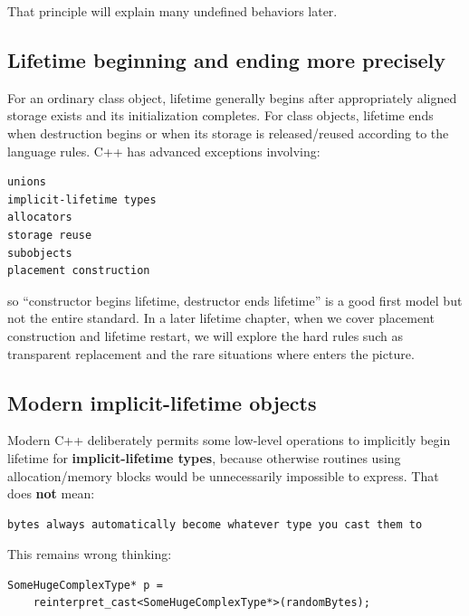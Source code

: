 That principle will explain many undefined behaviors later.

\subsection{Lifetime beginning and ending more precisely}\label{05-engine-i-ch002-lifetime-beginning-and-ending-more-precisely}

\hypertarget{05-engine-i-ch002-lifetime-beginning-and-ending-more-precisely}{}

For an ordinary class object, lifetime generally begins after appropriately aligned storage exists and its initialization completes. For class objects, lifetime ends when destruction begins or when its storage is released/reused according to the language rules. C++ has advanced exceptions involving:

\begin{verbatim}
unions
implicit-lifetime types
allocators
storage reuse
subobjects
placement construction
\end{verbatim}

so ``constructor begins lifetime, destructor ends lifetime'' is a good first model but not the entire standard. In a later lifetime chapter, when we cover placement construction and lifetime restart, we will explore the hard rules such as transparent replacement and the rare situations where  enters the picture.

\subsection{Modern implicit-lifetime objects}\label{05-engine-i-ch002-modern-implicit-lifetime-objects}

\hypertarget{05-engine-i-ch002-modern-implicit-lifetime-objects}{}

Modern C++ deliberately permits some low-level operations to implicitly begin lifetime for \textbf{implicit-lifetime types}, because otherwise routines using allocation/memory blocks would be unnecessarily impossible to express. That does \textbf{not} mean:

\begin{verbatim}
bytes always automatically become whatever type you cast them to
\end{verbatim}

This remains wrong thinking:

\begin{verbatim}
SomeHugeComplexType* p =
    reinterpret_cast<SomeHugeComplexType*>(randomBytes);
\end{verbatim}

